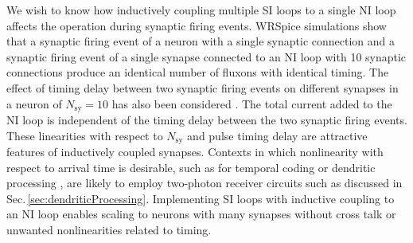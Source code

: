 \documentclass[twocolumn]{article}
\begin{document}
We wish to know how inductively coupling multiple SI loops to a single NI loop affects the operation during synaptic firing events. WRSpice simulations show that a synaptic firing event of a neuron with a single synaptic connection and a synaptic firing event of a single synapse connected to an NI loop with 10 synaptic connections produce an identical number of fluxons with identical timing. The effect of timing delay between two synaptic firing events on different synapses in a neuron of $N_{\mathrm{sy}} = 10$ has also been considered \cite{sh2018b}. The total current added to the NI loop is independent of the timing delay between the two synaptic firing events. These linearities with respect to $N_{\mathrm{sy}}$ and pulse timing delay are attractive features of inductively coupled synapses. Contexts in which nonlinearity with respect to arrival time is desirable, such as for temporal coding \cite{thde2001,sase2001} or dendritic processing \cite{brcl2010,haah2015}, are likely to employ two-photon receiver circuits such as discussed in Sec.\,\ref{sec:dendriticProcessing}. Implementing SI loops with inductive coupling to an NI loop enables scaling to neurons with many synapses without cross talk or unwanted nonlinearities related to timing.
 
\end{document}
